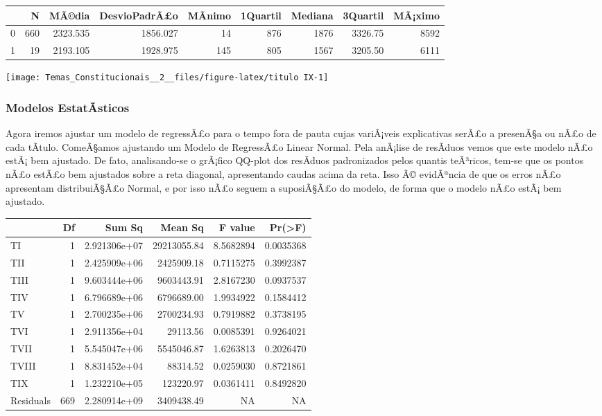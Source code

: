 \documentclass[]{article}
\begin{document}
\begin{longtable}[]{@{}lrrrrrrrr@{}}
\toprule
& N & MÃ©dia & DesvioPadrÃ£o & MÃ­nimo & 1Quartil & Mediana & 3Quartil &
MÃ¡ximo\tabularnewline
\midrule
\endhead
0 & 660 & 2323.535 & 1856.027 & 14 & 876 & 1876 & 3326.75 &
8592\tabularnewline
1 & 19 & 2193.105 & 1928.975 & 145 & 805 & 1567 & 3205.50 &
6111\tabularnewline
\bottomrule
\end{longtable}

\begin{center}\texttt{[image: Temas\_Constitucionais\_\_2\_\_files/figure-latex/titulo IX-1]} \end{center}

\subsubsection{Modelos EstatÃ­sticos}\label{modelos-estatasticos}

Agora iremos ajustar um modelo de regressÃ£o para o tempo fora de pauta
cujas variÃ¡veis explicativas serÃ£o a presenÃ§a ou nÃ£o de cada
tÃ­tulo. ComeÃ§amos ajustando um Modelo de RegressÃ£o Linear Normal.
Pela anÃ¡lise de resÃ­duos vemos que este modelo nÃ£o estÃ¡ bem
ajustado. De fato, analisando-se o grÃ¡fico QQ-plot dos resÃ­duos
padronizados pelos quantis teÃ³ricos, tem-se que os pontos nÃ£o estÃ£o
bem ajustados sobre a reta diagonal, apresentando caudas acima da reta.
Isso Ã© evidÃªncia de que os erros nÃ£o apresentam distribuiÃ§Ã£o
Normal, e por isso nÃ£o seguem a suposiÃ§Ã£o do modelo, de forma que o
modelo nÃ£o estÃ¡ bem ajustado.

\begin{longtable}[]{@{}lrrrrr@{}}
\toprule
& Df & Sum Sq & Mean Sq & F value & Pr(\textgreater{}F)\tabularnewline
\midrule
\endhead
TI & 1 & 2.921306e+07 & 29213055.84 & 8.5682894 &
0.0035368\tabularnewline
TII & 1 & 2.425909e+06 & 2425909.18 & 0.7115275 &
0.3992387\tabularnewline
TIII & 1 & 9.603444e+06 & 9603443.91 & 2.8167230 &
0.0937537\tabularnewline
TIV & 1 & 6.796689e+06 & 6796689.00 & 1.9934922 &
0.1584412\tabularnewline
TV & 1 & 2.700235e+06 & 2700234.93 & 0.7919882 &
0.3738195\tabularnewline
TVI & 1 & 2.911356e+04 & 29113.56 & 0.0085391 & 0.9264021\tabularnewline
TVII & 1 & 5.545047e+06 & 5545046.87 & 1.6263813 &
0.2026470\tabularnewline
TVIII & 1 & 8.831452e+04 & 88314.52 & 0.0259030 &
0.8721861\tabularnewline
TIX & 1 & 1.232210e+05 & 123220.97 & 0.0361411 &
0.8492820\tabularnewline
Residuals & 669 & 2.280914e+09 & 3409438.49 & NA & NA\tabularnewline
\bottomrule
\end{longtable}
\end{document}
